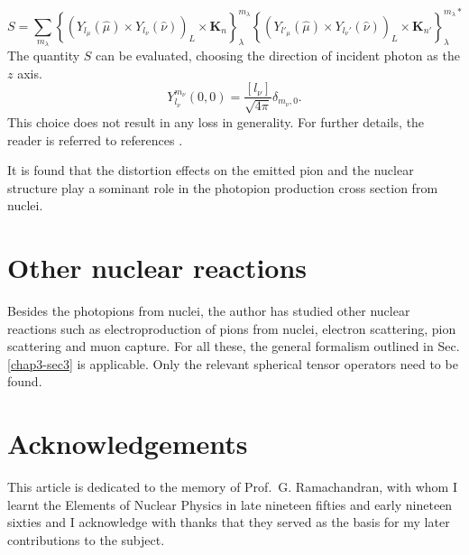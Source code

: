 \begin{equation}
  S= \sum_{m_\lambda} \left\{ (Y_{l_\mu} (\hat{\mu}) \times Y_{l_\nu} (\hat{\nu}))_L \times {\boldsymbol K}_n\right\}_\lambda^{m_\lambda} \left\{(Y_{l'_\mu} (\hat{\mu}) \times Y_{l_\nu'}(\hat{\nu}))_L \times {\boldsymbol K}_{n'} \right\}_{\lambda}^{m_\lambda\ast} \label{chap3-eq60}
\end{equation}
The quantity $S$ can be evaluated, choosing the direction of incident photon as the $z$ axis.
$$
Y_{l_\nu}^{m_\nu} (0, 0) = \frac{[l_\nu]}{\sqrt{4\pi}}\delta_{m_\nu, 0}.
$$
This choice does not result in any loss in generality. For further details, the reader is referred to references \cite{chap3-key20, chap3-key21}.

It is found that the distortion effects on the emitted pion and the nuclear structure play a sominant role \cite{chap3-key21} in the photopion production cross section from nuclei.

\section{Other nuclear reactions}\label{chap3-sec6}

Besides the photopions from nuclei, the author has studied other nuclear reactions such as electroproduction of pions from nuclei, electron scattering, pion scattering and muon capture. For all these, the general formalism outlined in Sec.\ref{chap3-sec3} is applicable. Only the relevant spherical tensor operators need to be found.
\bigskip

\section*{Acknowledgements}

This article is dedicated to the memory of Prof.\ G. Ramachandran, with whom I learnt the Elements of Nuclear Physics in late nineteen fifties and early nineteen sixties and I acknowledge with thanks that they served as the basis for my later contributions to the subject.


